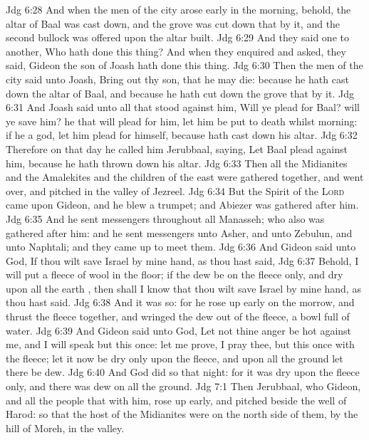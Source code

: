 \vs Jdg 6:28 And when the men of the city arose early in the morning, behold, the altar of Baal was cast down, and the grove was cut down that  by it, and the second bullock was offered upon the altar  built.
\vs Jdg 6:29 And they said one to another, Who hath done this thing? And when they enquired and asked, they said, Gideon the son of Joash hath done this thing.
\vs Jdg 6:30 Then the men of the city said unto Joash, Bring out thy son, that he may die: because he hath cast down the altar of Baal, and because he hath cut down the grove that  by it.
\vs Jdg 6:31 And Joash said unto all that stood against him, Will ye plead for Baal? will ye save him? he that will plead for him, let him be put to death whilst  morning: if he  a god, let him plead for himself, because  hath cast down his altar.
\vs Jdg 6:32 Therefore on that day he called him Jerubbaal, saying, Let Baal plead against him, because he hath thrown down his altar.
\vs Jdg 6:33 Then all the Midianites and the Amalekites and the children of the east were gathered together, and went over, and pitched in the valley of Jezreel.
\vs Jdg 6:34 But the Spirit of the \textsc{Lord} came upon Gideon, and he blew a trumpet; and Abiezer was gathered after him.
\vs Jdg 6:35 And he sent messengers throughout all Manasseh; who also was gathered after him: and he sent messengers unto Asher, and unto Zebulun, and unto Naphtali; and they came up to meet them.
\vs Jdg 6:36 And Gideon said unto God, If thou wilt save Israel by mine hand, as thou hast said,
\vs Jdg 6:37 Behold, I will put a fleece of wool in the floor;  if the dew be on the fleece only, and  dry upon all the earth , then shall I know that thou wilt save Israel by mine hand, as thou hast said.
\vs Jdg 6:38 And it was so: for he rose up early on the morrow, and thrust the fleece together, and wringed the dew out of the fleece, a bowl full of water.
\vs Jdg 6:39 And Gideon said unto God, Let not thine anger be hot against me, and I will speak but this once: let me prove, I pray thee, but this once with the fleece; let it now be dry only upon the fleece, and upon all the ground let there be dew.
\vs Jdg 6:40 And God did so that night: for it was dry upon the fleece only, and there was dew on all the ground.
\vs Jdg 7:1 Then Jerubbaal, who  Gideon, and all the people that  with him, rose up early, and pitched beside the well of Harod: so that the host of the Midianites were on the north side of them, by the hill of Moreh, in the valley.
